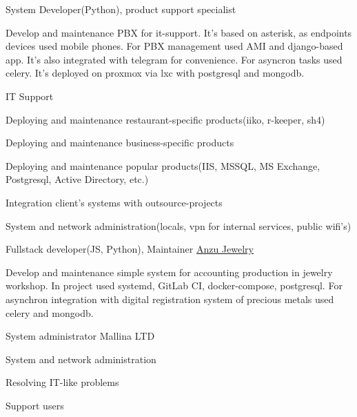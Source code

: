 \begin{cventries}
  \cventry
    {System Developer(Python), product support specialist } %
    {} %
    {} %
    {} %
    {
      \begin{cvitems} %
        Develop and maintenance PBX for it-support. It's based on asterisk, as endpoints devices used mobile phones.
        For PBX management used AMI and django-based app. It's also integrated with telegram for convenience.
        For asyncron tasks used celery.
        It's deployed on proxmox via lxc with postgresql and mongodb.
      \end{cvitems}
    }

  \cventry
    {IT Support} %
    {} %
    {} %
    {} %
    {
      \begin{cvitems} %
        \item {Deploying and maintenance restaurant-specific products(iiko, r-keeper, sh4)}
        \item {Deploying and maintenance business-specific products}
        \item {Deploying and maintenance popular products(IIS, MSSQL, MS Exchange, Postgresql,
        Active Directory, etc.)}
      \item {Integration client's systems with outsource-projects}
      \item {System and network administration(locals, vpn for internal services, public wifi's)}
      \end{cvitems}
    }
  \cventry
    {Fullstack developer(JS, Python), Maintainer}
    {\href{https://anzujewelry.com/}{Anzu Jewelry}}
    {} %
    {} %
    {
      \begin{cvitems}
        Develop and maintenance simple system for accounting production in jewelry workshop.
        In project used systemd, GitLab CI, docker-compose, postgresql.
        For asynchron integration with digital registration system of precious metals used celery and mongodb.
      \end{cvitems}
    }
  \cventry
    {System administrator} %
    {Mallina LTD} %
    {} %
    {} %
    {
      \begin{cvitems} %
        \item {System and network administration}
        \item {Resolving IT-like problems}
        \item {Support users}
      \end{cvitems}
    }

\end{cventries}
